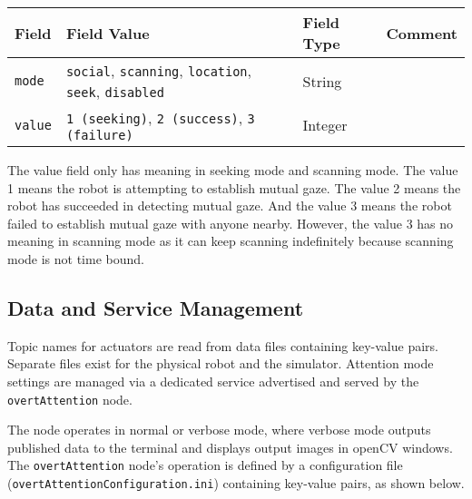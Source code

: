 \documentclass{CSSRforAfrica}
\begin{document}
\begin{center}
	\begin{tabularx}{\linewidth}{| l | X | l| l|}
		\hline 
		{\small Field }                                  & {\small Field Value}    &  {\small Field Type}  &     {\small Comment}   \\
		\hline
		{\footnotesize  \verb+mode+}          & {\footnotesize \verb+social+,  \verb+scanning+, \verb+location+, \verb+seek+, \verb+disabled+ } & {\footnotesize String} & \\ 
		\hline
		{\footnotesize  \verb+value+}  & {\footnotesize \verb+1 (seeking)+, \verb+2 (success)+, \verb+3 (failure)+    } & {\footnotesize Integer} & \\ 
		\hline
	\end{tabularx}
\end{center}
The value field only has meaning in seeking mode and scanning mode. The value 1 means the robot is attempting to establish mutual gaze. The value 2 means the robot has succeeded in detecting mutual gaze. And the value 3 means the robot failed to establish mutual gaze with anyone nearby. However, the value 3 has no meaning in scanning mode as it can keep scanning indefinitely because scanning mode is not time bound.
 
\subsection{Data and Service Management}
 
Topic names for actuators are read from data files containing key-value pairs. Separate files exist for the physical robot and the simulator. Attention mode settings are managed via a dedicated service advertised and served by the \texttt{overtAttention} node.
 
The node operates in normal or verbose mode, where verbose mode outputs published data to the terminal and displays output images in openCV windows. The \texttt{overtAttention} node's operation is defined by a configuration file (\texttt{overtAttentionConfiguration.ini}) containing key-value pairs, as shown below.
\end{document}
